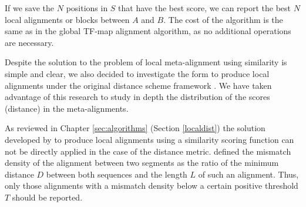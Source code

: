 \begin{center}
\end{center}

If we save the $N$ positions in $S$ that have the best score, we can report the best $N$ local
alignments or blocks between $A$ and $B$. The cost of the algorithm is the same as in the
global TF-map alignment algorithm, as no additional operations are necessary.


Despite the solution to the problem of local meta-alignment using similarity is simple
and clear, we also decided to investigate the form to produce local alignments under
the original distance scheme framework \citep{waterman:1984c}. We have taken advantage of
this research to study in depth the distribution of the scores (distance) in the meta-alignments.

As reviewed in Chapter \ref{sec:algorithms} (Section \ref{localdist}) the solution
developed by \citet{smith:1981c} to produce local alignments using a similarity
scoring function can not be directly applied in the case of the distance metric.
\citet{goad:1982a} defined the mismatch density of the alignment between two segments as 
the ratio of the minimum distance $D$ between both sequences and the length $L$ of such 
an alignment. Thus, only those alignments with a mismatch density below a certain positive 
threshold $T$ should be reported.


